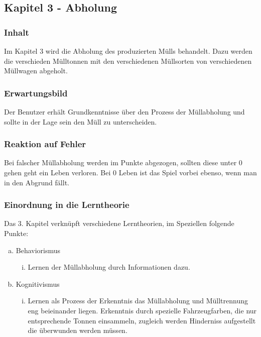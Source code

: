 \documentclass[a4paper]{article}
\begin{document}
    \subsection{Kapitel 3 - Abholung}
        \subsubsection{Inhalt}
            Im Kapitel 3 wird die Abholung des produzierten Mülls behandelt. Dazu werden die verschieden Mülltonnen mit den verschiedenen Müllsorten von verschiedenen Müllwagen abgeholt.
        \subsubsection{Erwartungsbild}
            Der Benutzer erhält Grundkenntnisse über den Prozess der Müllabholung und sollte in der Lage sein den Müll zu unterscheiden.
        \subsubsection{Reaktion auf Fehler}
            Bei falscher Müllabholung werden im Punkte abgezogen, sollten diese unter 0 gehen geht ein Leben verloren. Bei 0 Leben ist das Spiel vorbei ebenso, wenn man in den Abgrund fällt.
        \subsubsection{Einordnung in die Lerntheorie}
            Das 3. Kapitel verknüpft verschiedene Lerntheorien, im Speziellen folgende Punkte:
            \begin{enumerate}[(a)]
                \item Behaviorismus
                \begin{enumerate}[(i)]
                    \item Lernen der Müllabholung durch Informationen dazu.
                \end{enumerate}

                \item Kognitivismus
                \begin{enumerate}[(i)]
                    \item Lernen als Prozess der Erkenntnis das Müllabholung und Mülltrennung eng beieinander liegen. Erkenntnis durch spezielle Fahrzeugfarben, die nur entsprechende Tonnen einsammeln, zugleich werden Hinderniss aufgestellt die überwunden werden müssen.
                \end{enumerate}
            \end{enumerate}
\end{document}
